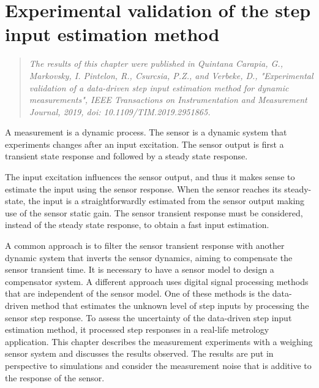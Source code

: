 \glsresetall

\chapter{Experimental validation of the step input estimation method }\label{chap:ExperimentalValidation}


\begin{quote}
\vspace{-0.75cm}
\emph{The results of this chapter were published in Quintana Carapia, G., Markovsky, I. Pintelon, R., Csurcsia, P.Z., and Verbeke, D., "Experimental validation of a data-driven step input estimation method for dynamic measurements", IEEE Transactions on Instrumentation and Measurement Journal, 2019, doi: 10.1109/TIM.2019.2951865. \nocite{QuintanaTIM} }\vfill{}
\end{quote}



A measurement is a dynamic process. 
The sensor is a dynamic system that experiments changes after an input excitation.
The sensor output is first a transient state response and followed by a steady state response.

The input excitation influences the sensor output, and thus it makes sense to estimate the input using the sensor response.
When the sensor reaches its steady-state, the input is a straightforwardly estimated from the sensor output making use of the sensor static gain.
The sensor transient response must be considered, instead of the steady state response, to obtain a fast input estimation.

A common approach is to filter the sensor transient response with another dynamic system that inverts the sensor dynamics, aiming to compensate the sensor transient time.
It is necessary to have a sensor model to design a compensator system. 
A different approach uses digital signal processing methods that are independent of the sensor model.
One of these methods is the data-driven method that estimates the unknown level of step inputs by processing the sensor step response. 
To assess the uncertainty of the data-driven step input estimation method, it processed step responses in a real-life metrology application. 
This chapter describes the measurement experiments with a weighing sensor system and discusses the results observed.
The results are put in perspective to simulations and consider the measurement noise that is additive to the response of the sensor. 

